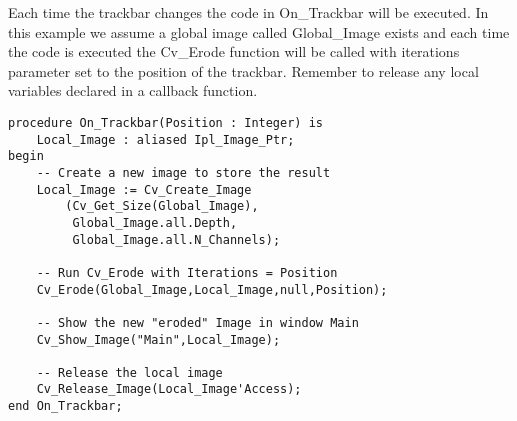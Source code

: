 Each time the trackbar changes the code in On_Trackbar will be executed. In this example we assume a global image called Global_Image exists and each time the code is executed the Cv_Erode function will be called with iterations parameter set to the position of the trackbar. Remember to release any local variables declared in a callback function.
\begin{lstlisting}
procedure On_Trackbar(Position : Integer) is
	Local_Image : aliased Ipl_Image_Ptr;
begin
	-- Create a new image to store the result
	Local_Image := Cv_Create_Image
		(Cv_Get_Size(Global_Image),
		 Global_Image.all.Depth,
		 Global_Image.all.N_Channels);

	-- Run Cv_Erode with Iterations = Position
	Cv_Erode(Global_Image,Local_Image,null,Position);

	-- Show the new "eroded" Image in window Main
	Cv_Show_Image("Main",Local_Image);

	-- Release the local image
	Cv_Release_Image(Local_Image'Access);
end On_Trackbar;
\end{lstlisting}
